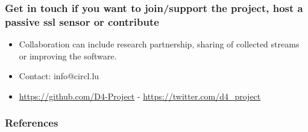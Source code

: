 \documentclass{beamer}
\begin{document}
\begin{frame}
\frametitle{Get in touch if you want to join/support the project, host a passive ssl sensor or contribute}
\begin{itemize}
\item Collaboration can include research partnership, sharing of collected streams or improving the software.
\item Contact: info@circl.lu
\item \url{https://github.com/D4-Project} -  \url{https://twitter.com/d4_project}
\end{itemize}
\end{frame}

\nocite{*} 
\begin{frame}[allowframebreaks]
        \frametitle{References}
        
        
\end{frame}
\end{document}
